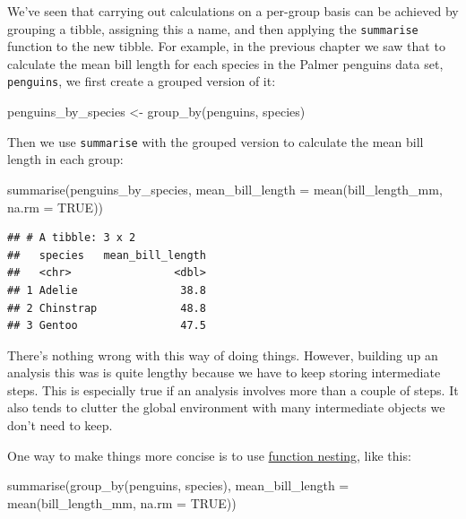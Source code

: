 \documentclass[
]{book}
\newenvironment{Shaded}{\begin{snugshade}}{\end{snugshade}}
\newcommand{\AttributeTok}[1]{\textcolor[rgb]{0.77,0.63,0.00}{#1}}
\newcommand{\ConstantTok}[1]{\textcolor[rgb]{0.00,0.00,0.00}{#1}}
\newcommand{\FunctionTok}[1]{\textcolor[rgb]{0.00,0.00,0.00}{#1}}
\newcommand{\NormalTok}[1]{#1}
\newcommand{\OtherTok}[1]{\textcolor[rgb]{0.56,0.35,0.01}{#1}}
\begin{document}
We've seen that carrying out calculations on a per-group basis can be achieved by grouping a tibble, assigning this a name, and then applying the \texttt{summarise} function to the new tibble. For example, in the previous chapter we saw that to calculate the mean bill length for each species in the Palmer penguins data set, \texttt{penguins}, we first create a grouped version of it:

\begin{Shaded}
\begin{Highlighting}[]
\NormalTok{penguins\_by\_species }\OtherTok{\textless{}{-}} \FunctionTok{group\_by}\NormalTok{(penguins, species)}
\end{Highlighting}
\end{Shaded}

Then we use \texttt{summarise} with the grouped version to calculate the mean bill length in each group:

\begin{Shaded}
\begin{Highlighting}[]
\FunctionTok{summarise}\NormalTok{(penguins\_by\_species, }
          \AttributeTok{mean\_bill\_length =} \FunctionTok{mean}\NormalTok{(bill\_length\_mm, }\AttributeTok{na.rm =} \ConstantTok{TRUE}\NormalTok{))}
\end{Highlighting}
\end{Shaded}

\begin{verbatim}
## # A tibble: 3 x 2
##   species   mean_bill_length
##   <chr>                <dbl>
## 1 Adelie                38.8
## 2 Chinstrap             48.8
## 3 Gentoo                47.5
\end{verbatim}

There's nothing wrong with this way of doing things. However, building up an analysis this was is quite lengthy because we have to keep storing intermediate steps. This is especially true if an analysis involves more than a couple of steps. It also tends to clutter the global environment with many intermediate objects we don't need to keep.

One way to make things more concise is to use \protect\hyperlink{combining-functions}{function nesting}, like this:

\begin{Shaded}
\begin{Highlighting}[]
\FunctionTok{summarise}\NormalTok{(}\FunctionTok{group\_by}\NormalTok{(penguins, species), }
          \AttributeTok{mean\_bill\_length =} \FunctionTok{mean}\NormalTok{(bill\_length\_mm, }\AttributeTok{na.rm =} \ConstantTok{TRUE}\NormalTok{))}
\end{Highlighting}
\end{Shaded}
\end{document}
